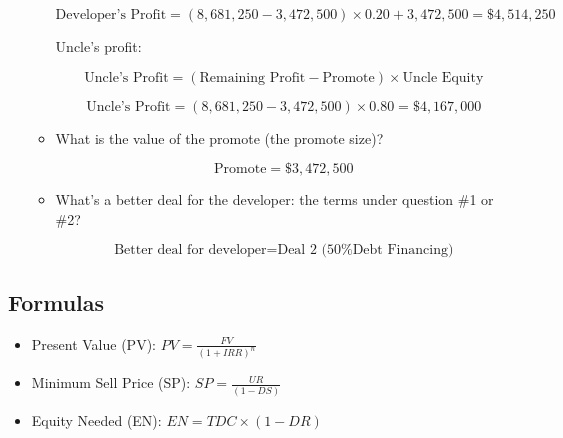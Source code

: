 \documentclass[a1paper]{article}
\begin{document}
\begin{itemize}
\begin{itemize}
        \[
        \text{Developer's Profit} = (8,681,250 - 3,472,500) \times 0.20 + 3,472,500 = \$4,514,250
        \]
        
        Uncle's profit:
        
        \[
        \text{Uncle's Profit} = (\text{Remaining Profit} - \text{Promote}) \times \text{Uncle Equity}
        \]
        
        \[
        \text{Uncle's Profit} = (8,681,250 - 3,472,500) \times 0.80 = \$4,167,000
        \]
        
        \item What is the value of the promote (the promote size)?
        
        \[
        \text{Promote} = \$3,472,500
        \]
        
        \item What’s a better deal for the developer: the terms under question \#1 or \#2?
        
        \[
        \text{Better deal for developer} = \text{Deal 2 (50\% Debt Financing)}
        \]
    \end{itemize}
\end{itemize}

\subsection*{Formulas}

\begin{itemize}
    \item Present Value (PV): \( PV = \frac{FV}{(1 + IRR)^n} \)
    \item Minimum Sell Price (SP): \( SP = \frac{UR}{(1 - DS)} \)
    \item Equity Needed (EN): \( EN = TDC \times (1 - DR) \)
\end{itemize}
\end{document}

